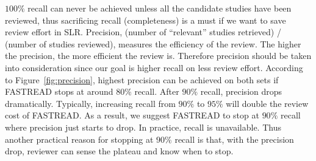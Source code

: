 \documentclass[final,twocolumn,5p]{elsarticle}
\theoremstyle{break}
\begin{document}
$100\%$ recall can never be achieved unless all the candidate studies have been reviewed, thus sacrificing recall (completeness) is a must if we want to save review effort in SLR. Precision, (number of ``relevant'' studies retrieved) / (number of studies reviewed), measures the efficiency of the review. The higher the precision, the more efficient the review is. Therefore precision should be taken into consideration since our goal is higher recall on less review effort. According to Figure~\ref{fig:precision}, highest precision can be achieved on both sets if FASTREAD stops at around $80\%$ recall. After $90\%$ recall, precision drops dramatically. Typically, increasing recall from $90\%$ to $95\%$ will double the review cost of FASTREAD. As a result, we suggest FASTREAD to stop at $90\%$ recall where precision just starts to drop. In practice, recall is unavailable. Thus another practical reason for stopping at $90\%$ recall is that, with the precision drop, reviewer can sense the plateau and know when to stop. 
\end{document}
